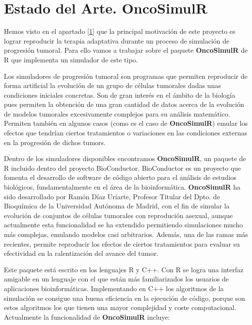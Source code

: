 \chapter{Estado del Arte. OncoSimulR\label{sec:estado_del_arte}}\label{2}
Hemos visto en el apartado \ref{1} que la principal motivación de este proyecto es lograr reproducir la terapia adaptativa durante un proceso de simulación de progresión tumoral. Para ello vamos a trabajar sobre el paquete \textbf{OncoSimulR} \cite{OncoSimulR} de R que implementa un simulador de este tipo.

Los simuladores de progresión tumoral son programas que permiten reproducir de forma artificial la evolución de un grupo de células tumorales dadas unas condiciones iniciales concretas. Son de gran interés en el ámbito de la biología pues permiten la obtención de una gran cantidad de datos acerca de la evolución de modelos tumorales excesivamente complejos para su análisis matemático. Permiten también en algunos casos (como es el caso de \textbf{OncoSimulR}) emular los efectos que tendrían ciertos tratamientos o variaciones en las condiciones externas en la progresión de dichos \glspl{tumor}.

Dentro de los simuladores disponibles encontramos \textbf{OncoSimulR}, un paquete de R incluido dentro del proyecto BioConductor\cite{Bioconductor}. BioConductor es un proyecto que fomenta el desarrollo de software de código abierto para el análisis de estudios biológicos, fundamentalmente en el área de la bioinformática. \textbf{OncoSimulR} ha sido desarrollado por Ramón Díaz Uriarte, Profesor Titular del Dpto. de Bioquímica de la Universidad Autónoma de Madrid, con el fin de simular la evolución de conjuntos de células tumorales con reprodución asexual, aunque actualmente esta funcionalidad se ha extendido permitiendo simulaciones mucho más complejas, emulando modelos casi arbitrarios. Además, una de las ramas más recientes, permite reproducir los efectos de ciertos tratamientos para evaluar su efectividad en la ralentización del avance del \gls{tumor}.

Este paquete está escrito en los lenguajes R y C++. Con R se logra una interfaz amigable en un lenguaje con el que están más familiarizados los usuarios de aplicaciones bioinformáticas. Implementando en C++ los algoritmos de la simulación se consigue una buena eficiencia en la ejecución de código, porque son estos algoritmos los que tienen una mayor complejidad y coste computacional. Actualmente la funcionalidad de \textbf{OncoSimulR} incluye:

